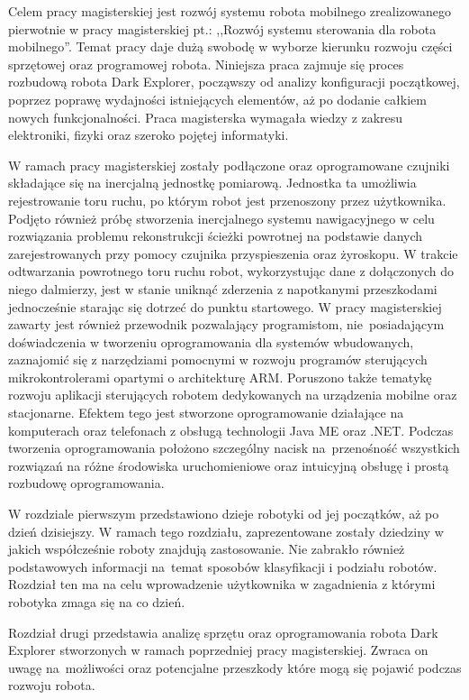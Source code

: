 Celem pracy magisterskiej jest rozwój systemu robota mobilnego zrealizowanego
pierwotnie w pracy magisterskiej pt.: ,,Rozwój systemu sterowania dla robota
mobilnego''\cite{KmakMScThesis2009}. Temat pracy daje dużą swobodę w wyborze
kierunku rozwoju części sprzętowej oraz programowej robota. Niniejsza praca
zajmuje się proces rozbudową robota Dark Explorer, począwszy od analizy
konfiguracji początkowej, poprzez poprawę wydajności istniejących elementów, aż
po dodanie całkiem nowych funkcjonalności. Praca magisterska wymagała wiedzy z
zakresu elektroniki, fizyki oraz szeroko pojętej informatyki.

W ramach pracy magisterskiej zostały podłączone oraz oprogramowane czujniki
składające się na inercjalną jednostkę pomiarową. Jednostka ta umożliwia
rejestrowanie toru ruchu, po którym robot jest przenoszony przez użytkownika.
Podjęto również próbę stworzenia inercjalnego systemu nawigacyjnego w celu
rozwiązania problemu rekonstrukcji ścieżki powrotnej na podstawie danych
zarejestrowanych przy pomocy czujnika przyspieszenia oraz żyroskopu. W trakcie
odtwarzania powrotnego toru ruchu robot, wykorzystując dane z dołączonych do
niego dalmierzy, jest w stanie uniknąć zderzenia z napotkanymi przeszkodami
jednocześnie starając się dotrzeć do punktu startowego. W pracy magisterskiej
zawarty jest również przewodnik pozwalający programistom, nie~posiadającym
doświadczenia w tworzeniu oprogramowania dla systemów wbudowanych, zaznajomić się
z narzędziami pomocnymi w rozwoju programów sterujących mikrokontrolerami
opartymi o architekturę ARM. Poruszono także tematykę rozwoju aplikacji
sterujących robotem dedykowanych na urządzenia mobilne oraz stacjonarne. Efektem
tego jest stworzone oprogramowanie działające na komputerach oraz telefonach z
obsługą technologii Java ME oraz .NET. Podczas tworzenia oprogramowania położono
szczególny nacisk na~przenośność wszystkich rozwiązań na różne środowiska
uruchomieniowe oraz intuicyjną obsługę i prostą rozbudowę oprogramowania.

W rozdziale pierwszym przedstawiono dzieje robotyki od jej początków, aż po dzień
dzisiejszy. W ramach tego rozdziału, zaprezentowane zostały dziedziny w jakich
współcześnie roboty znajdują zastosowanie. Nie zabrakło również podstawowych
informacji na~temat sposobów klasyfikacji i podziału robotów. Rozdział ten ma na
celu wprowadzenie użytkownika w zagadnienia z którymi robotyka zmaga się na co
dzień.

Rozdział drugi przedstawia analizę sprzętu oraz oprogramowania robota Dark
Explorer stworzonych w ramach poprzedniej pracy magisterskiej. Zwraca on uwagę
na~możliwości oraz potencjalne przeszkody które mogą się pojawić podczas rozwoju
robota.


